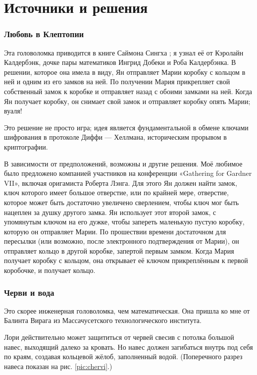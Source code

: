 \section*{Источники и решения}

\subsubsection*{Любовь в Клептопии}

Эта головоломка приводится в книге Саймона Сингха \cite{singh};
я узнал её от Кэролайн Калдербэнк, дочке пары математиков Ингрид Добеки и Роба Калдербэнка.
В решении, которое она имела в виду, Ян отправляет Марии коробку с кольцом в ней и одним из его замков на ней. По получении Мария прикрепляет свой собственный замок к коробке и отправляет назад с обоими замками на ней.
Когда Ян получает коробку, он снимает свой замок и отправляет коробку опять Марии; вуаля!

Это решение не просто игра;
идея является фундаментальной в обмене ключами шифрования в протоколе Диффи — Хеллмана, историческим прорывом в криптографии.

В зависимости от предположений, возможны и другие решения.
Моё любимое было предложено компанией участников на конференции
«Ga\-the\-ring for Gardner VII», включая оригамиста Роберта Лэнга.
Для этого Ян должен найти замок, ключ которого имеет большое отверстие, или по крайней мере, отверстие, которое может быть достаточно увеличено сверлением, чтобы ключ мог быть нацеплен за душку другого замка.
Ян использует этот второй замок, с упомянутым ключом на его дужке, чтобы запереть маленькую пустую коробку, которую он отправляет Марии.
По прошествии времени достаточном для пересылки (или возможно, после электронного подтверждения от Марии), он отправляет кольцо в другой коробке, запертой первым замком.
Когда Мария получает коробку с кольцом, она открывает её ключом прикреплённым к первой коробочке, и получает кольцо.

\subsubsection*{Черви и вода}

Это скорее инженерная головоломка, чем математическая.
Она пришла ко мне от Балинта Вирага из Массачусетского технологического института.

Лори действительно может защититься от червей свесив с потолка большой навес, выходящий далеко за кровать.
Но навес должен загибаться внутрь под себя по краям, создавая кольцевой жёлоб, заполненный водой.
(Поперечного разрез навеса показан на рис. \ref{pic:chervi}.)

